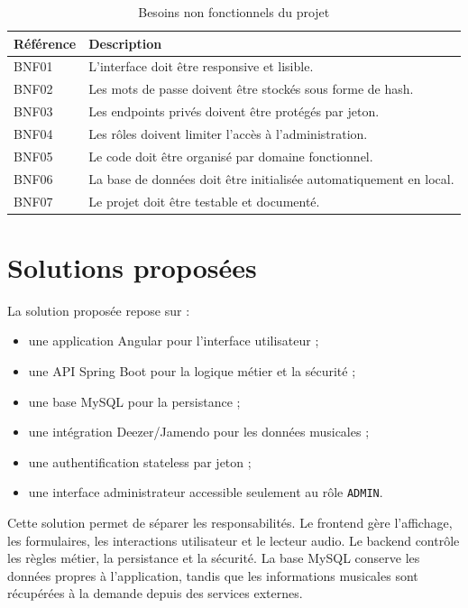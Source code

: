 \documentclass[12pt,a4paper]{report}
\newcommand{\code}[1]{\texttt{#1}}
\newcommand{\tableHeader}{\rowcolor{primary!12}}
\begin{document}
\begin{longtable}{|p{2.4cm}|p{11.2cm}|}
\caption{Besoins non fonctionnels du projet} \\
\hline
\tableHeader \textbf{Référence} & \textbf{Description} \\
\hline
BNF01 & L'interface doit être responsive et lisible. \\
\hline
BNF02 & Les mots de passe doivent être stockés sous forme de hash. \\
\hline
BNF03 & Les endpoints privés doivent être protégés par jeton. \\
\hline
BNF04 & Les rôles doivent limiter l'accès à l'administration. \\
\hline
BNF05 & Le code doit être organisé par domaine fonctionnel. \\
\hline
BNF06 & La base de données doit être initialisée automatiquement en local. \\
\hline
BNF07 & Le projet doit être testable et documenté. \\
\hline
\end{longtable}

\section{Solutions proposées}

La solution proposée repose sur :

\begin{itemize}
    \item une application Angular pour l'interface utilisateur ;
    \item une API Spring Boot pour la logique métier et la sécurité ;
    \item une base MySQL pour la persistance ;
    \item une intégration Deezer/Jamendo pour les données musicales ;
    \item une authentification stateless par jeton ;
    \item une interface administrateur accessible seulement au rôle
    \code{ADMIN}.
\end{itemize}

Cette solution permet de séparer les responsabilités. Le frontend gère
l'affichage, les formulaires, les interactions utilisateur et le lecteur audio.
Le backend contrôle les règles métier, la persistance et la sécurité. La base
MySQL conserve les données propres à l'application, tandis que les informations
musicales sont récupérées à la demande depuis des services externes.
\end{document}
